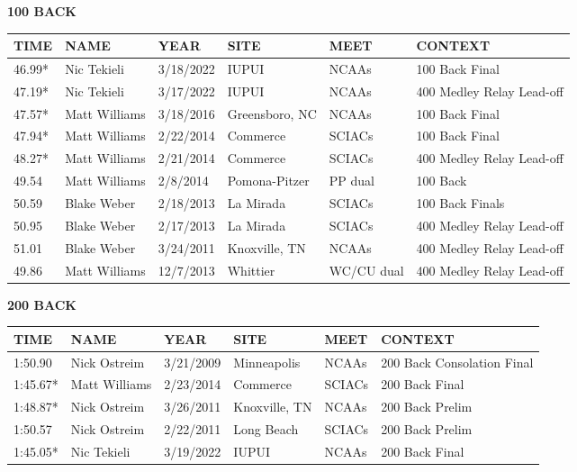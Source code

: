 \vspace{0.4cm}

\begin{minipage}[t]{0.48\textwidth}
\centering
\textbf{100 BACK}\\[0.05cm]
\begin{tabular}{@{}p{1.8cm}p{2.8cm}p{1.2cm}p{1.4cm}p{1.4cm}p{2.0cm}@{}}
\hline
\textbf{TIME} & \textbf{NAME} & \textbf{YEAR} & \textbf{SITE} & \textbf{MEET} & \textbf{CONTEXT} \\
\hline
46.99* & Nic Tekieli & 3/18/2022 & IUPUI & NCAAs & 100 Back Final \\
47.19* & Nic Tekieli & 3/17/2022 & IUPUI & NCAAs & 400 Medley Relay Lead-off \\
47.57* & Matt Williams & 3/18/2016 & Greensboro, NC & NCAAs & 100 Back Final \\
47.94* & Matt Williams & 2/22/2014 & Commerce & SCIACs & 100 Back Final \\
48.27* & Matt Williams & 2/21/2014 & Commerce & SCIACs & 400 Medley Relay Lead-off \\
49.54 & Matt Williams & 2/8/2014 & Pomona-Pitzer & PP dual & 100 Back \\
50.59 & Blake Weber & 2/18/2013 & La Mirada & SCIACs & 100 Back Finals \\
50.95 & Blake Weber & 2/17/2013 & La Mirada & SCIACs & 400 Medley Relay Lead-off \\
51.01 & Blake Weber & 3/24/2011 & Knoxville, TN & NCAAs & 400 Medley Relay Lead-off \\
49.86 & Matt Williams & 12/7/2013 & Whittier & WC/CU dual & 400 Medley Relay Lead-off \\
\hline
\end{tabular}
\end{minipage}\hfill
\begin{minipage}[t]{0.48\textwidth}
\centering
\textbf{200 BACK}\\[0.05cm]
\begin{tabular}{@{}p{1.8cm}p{2.8cm}p{1.2cm}p{1.4cm}p{1.4cm}p{2.0cm}@{}}
\hline
\textbf{TIME} & \textbf{NAME} & \textbf{YEAR} & \textbf{SITE} & \textbf{MEET} & \textbf{CONTEXT} \\
\hline
1:50.90 & Nick Ostreim & 3/21/2009 & Minneapolis & NCAAs & 200 Back Consolation Final \\
1:45.67* & Matt Williams & 2/23/2014 & Commerce & SCIACs & 200 Back Final \\
1:48.87* & Nick Ostreim & 3/26/2011 & Knoxville, TN & NCAAs & 200 Back Prelim \\
1:50.57 & Nick Ostreim & 2/22/2011 & Long Beach & SCIACs & 200 Back Prelim \\
1:45.05* & Nic Tekieli & 3/19/2022 & IUPUI & NCAAs & 200 Back Final \\
\hline
\end{tabular}
\end{minipage}

